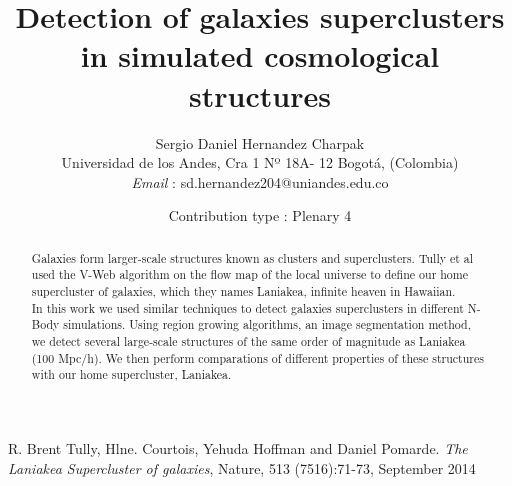 \documentclass{article}
\begin{document}
\title{Detection of galaxies superclusters in simulated cosmological structures}
\author{Sergio Daniel Hernandez Charpak\\
{\small  Universidad de los Andes, Cra 1 Nº 18A- 12 Bogotá, (Colombia)} \\
{\small {\itshape Email} : sd.hernandez204@uniandes.edu.co}}



%

\date{Contribution type : Plenary 4}

%

\maketitle


\begin{abstract} 
Galaxies form larger-scale structures known as clusters and superclusters. Tully et al
used the V-Web algorithm on the flow map of the local universe to define our home
supercluster of galaxies, which they names Laniakea, infinite heaven in Hawaiian.\\
In this work we used similar techniques to detect galaxies superclusters in different
N-Body simulations. Using region growing algorithms, an image segmentation method, we
detect several large-scale structures of the same order of magnitude as Laniakea (100 Mpc/h).
We then perform comparations of different properties of these structures with our home supercluster, Laniakea.
\end{abstract}


\begin{thebibliography}{00} 
 R. Brent Tully, Hlne. Courtois, Yehuda Hoffman and Daniel Pomarde. 
{\em The Laniakea Supercluster of galaxies}, Nature, 513 (7516):71-73, September 2014 


\end{thebibliography} 
\end{document}
